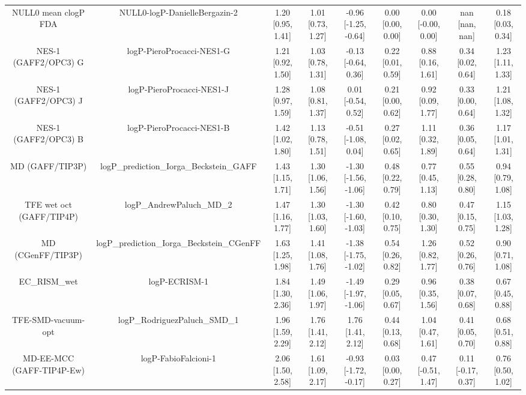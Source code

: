 \documentclass{article}
\begin{document}
\begin{center}
\begin{longtable}{|ccccccccc|}
         NULL0 mean clogP FDA &                  NULL0-logP-DanielleBergazin-2 &  1.20 [0.95, 1.41] &  1.01 [0.73, 1.27] &  -0.96 [-1.25, -0.64] &  0.00 [0.00, 0.00] &    0.00 [-0.00, 0.00] &        nan [nan, nan] &     0.18 [0.03, 0.34] \\
         NES-1 (GAFF2/OPC3) G &                      logP-PieroProcacci-NES1-G &  1.21 [0.92, 1.50] &  1.03 [0.78, 1.31] &   -0.13 [-0.64, 0.36] &  0.22 [0.01, 0.59] &     0.88 [0.16, 1.61] &     0.34 [0.02, 0.64] &     1.23 [1.11, 1.33] \\
         NES-1 (GAFF2/OPC3) J &                      logP-PieroProcacci-NES1-J &  1.28 [0.97, 1.59] &  1.08 [0.81, 1.37] &    0.01 [-0.54, 0.52] &  0.21 [0.00, 0.62] &     0.92 [0.09, 1.77] &     0.33 [0.00, 0.64] &     1.21 [1.08, 1.32] \\
         NES-1 (GAFF2/OPC3) B &                      logP-PieroProcacci-NES1-B &  1.42 [1.02, 1.80] &  1.13 [0.78, 1.51] &   -0.51 [-1.08, 0.04] &  0.27 [0.02, 0.65] &     1.11 [0.32, 1.89] &     0.36 [0.05, 0.64] &     1.17 [1.01, 1.31] \\
              MD (GAFF/TIP3P) &       logP\_prediction\_Iorga\_Beckstein\_GAFF &  1.43 [1.15, 1.71] &  1.30 [1.06, 1.56] &  -1.30 [-1.56, -1.06] &  0.48 [0.22, 0.79] &     0.77 [0.45, 1.13] &     0.55 [0.28, 0.80] &     0.94 [0.79, 1.08] \\
     TFE wet oct (GAFF/TIP4P) &                      logP\_AndrewPaluch\_MD\_2 &  1.47 [1.16, 1.77] &  1.30 [1.03, 1.60] &  -1.30 [-1.60, -1.03] &  0.42 [0.10, 0.75] &     0.80 [0.30, 1.30] &     0.47 [0.15, 0.75] &     1.15 [1.03, 1.28] \\
            MD (CGenFF/TIP3P) &     logP\_prediction\_Iorga\_Beckstein\_CGenFF &  1.63 [1.25, 1.98] &  1.41 [1.08, 1.76] &  -1.38 [-1.75, -1.02] &  0.54 [0.26, 0.82] &     1.26 [0.82, 1.77] &     0.52 [0.26, 0.76] &     0.90 [0.71, 1.08] \\
                  EC_RISM_wet &                                  logP-ECRISM-1 &  1.84 [1.30, 2.36] &  1.49 [1.06, 1.97] &  -1.49 [-1.97, -1.06] &  0.29 [0.05, 0.67] &     0.96 [0.35, 1.56] &     0.38 [0.07, 0.68] &     0.67 [0.45, 0.88] \\
           TFE-SMD-vacuum-opt &                  logP\_RodriguezPaluch\_SMD\_1 &  1.96 [1.59, 2.29] &  1.76 [1.41, 2.12] &     1.76 [1.41, 2.12] &  0.44 [0.13, 0.68] &     1.04 [0.47, 1.61] &     0.41 [0.05, 0.70] &     0.68 [0.51, 0.88] \\
    MD-EE-MCC (GAFF-TIP4P-Ew) &                           logP-FabioFalcioni-1 &  2.06 [1.50, 2.58] &  1.61 [1.09, 2.17] &  -0.93 [-1.72, -0.17] &  0.03 [0.00, 0.27] &    0.47 [-0.51, 1.47] &    0.11 [-0.17, 0.37] &     0.76 [0.50, 1.02] \\

\end{longtable}
\end{center}
\end{document}
